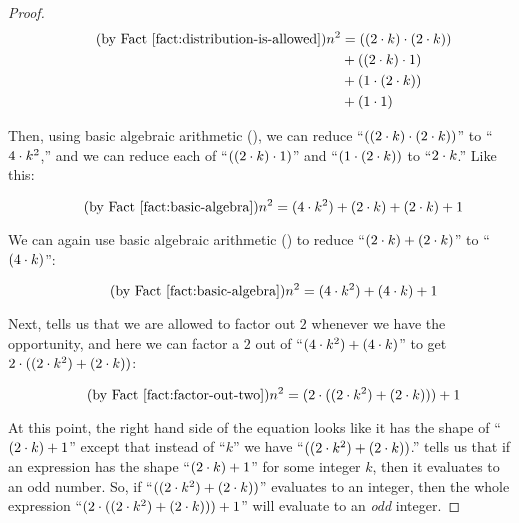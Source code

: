 \documentclass[../../../main.tex]{subfiles}
\begin{document}
\begin{proof}
\begin{align*}
  \tag{by \factref{fact:distribution-is-allowed}}
  n^{2} &= ((2 \mult/ k) \mult/ (2 \mult/ k)) \\
        &+ ((2 \mult/ k) \mult/ 1) \\
        &+ (1 \mult/ (2 \mult/ k)) \\
        &+ (1 \mult/ 1)
\end{align*}

Then, using basic algebraic arithmetic (), we can reduce ``$((2 \mult/ k) \mult/ (2 \mult/ k))$'' to ``$4 \mult/ k^{2}$,'' and we can reduce each of ``$((2 \mult/ k) \mult/ 1)$'' and ``$(1 \mult/ (2 \mult/ k))$ to ``$2 \mult/ k$.'' Like this:

\begin{equation*}
  \tag{by \factref{fact:basic-algebra}}
  n^{2} = (4 \mult/ k^{2}) + (2 \mult/ k) + (2 \mult/ k) + 1
\end{equation*}

We can again use basic algebraic arithmetic () to reduce ``$(2 \mult/ k) + (2 \mult/ k)$'' to ``$(4 \mult/ k)$'':

\begin{equation*}
  \tag{by \factref{fact:basic-algebra}}
  n^{2} = (4 \mult/ k^{2}) + (4 \mult/ k) + 1
\end{equation*}

Next,  tells us that we are allowed to factor out $2$ whenever we have the opportunity, and here we can factor a $2$ out of ``$(4 \mult/ k^{2}) + (4 \mult/ k)$'' to get $2 \mult/ ((2 \mult/ k^{2}) + (2 \mult/ k))$:

\begin{equation*}
  \tag{by \factref{fact:factor-out-two}}
  n^{2} = (2 \mult/ ((2 \mult/ k^{2}) + (2 \mult/ k))) + 1
\end{equation*}

At this point, the right hand side of the equation looks like it has the shape of ``$(2 \mult/ k) + 1$'' except that instead of ``$k$'' we have ``$((2 \mult/ k^{2}) + (2 \mult/ k))$.''  tells us that if an expression has the shape ``$(2 \mult/ k) + 1$'' for some integer $k$, then it evaluates to an odd number. So, if ``$((2 \mult/ k^{2}) + (2 \mult/ k))$'' evaluates to an integer, then the whole expression ``$(2 \mult/ ((2 \mult/ k^{2}) + (2 \mult/ k))) + 1$'' will evaluate to an \emph{odd} integer.


\end{proof}
\end{document}
